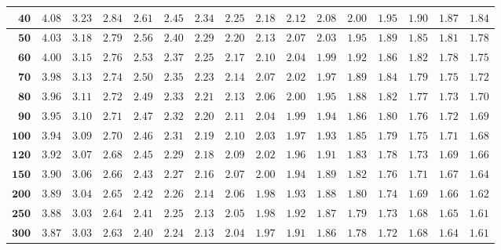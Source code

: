 \begin{longtable}{|r|r|r|r|r|r|r|r|r|r|r|r|r|r|r|r|}
    \(\mathbf{40}\) & \(4.08\) & \(3.23\) & \(2.84\) & \(2.61\) & \(2.45\) & \(2.34\) & \(2.25\) & \(2.18\) & \(2.12\) & \(2.08\) & \(2.00\) & \(1.95\) & \(1.90\) & \(1.87\) & \(1.84\) \\ \hline
    \(\mathbf{50}\) & \(4.03\) & \(3.18\) & \(2.79\) & \(2.56\) & \(2.40\) & \(2.29\) & \(2.20\) & \(2.13\) & \(2.07\) & \(2.03\) & \(1.95\) & \(1.89\) & \(1.85\) & \(1.81\) & \(1.78\) \\ \hline
    \(\mathbf{60}\) & \(4.00\) & \(3.15\) & \(2.76\) & \(2.53\) & \(2.37\) & \(2.25\) & \(2.17\) & \(2.10\) & \(2.04\) & \(1.99\) & \(1.92\) & \(1.86\) & \(1.82\) & \(1.78\) & \(1.75\) \\ \hline
    \(\mathbf{70}\) & \(3.98\) & \(3.13\) & \(2.74\) & \(2.50\) & \(2.35\) & \(2.23\) & \(2.14\) & \(2.07\) & \(2.02\) & \(1.97\) & \(1.89\) & \(1.84\) & \(1.79\) & \(1.75\) & \(1.72\) \\ \hline
    \(\mathbf{80}\) & \(3.96\) & \(3.11\) & \(2.72\) & \(2.49\) & \(2.33\) & \(2.21\) & \(2.13\) & \(2.06\) & \(2.00\) & \(1.95\) & \(1.88\) & \(1.82\) & \(1.77\) & \(1.73\) & \(1.70\) \\ \hline
    \(\mathbf{90}\) & \(3.95\) & \(3.10\) & \(2.71\) & \(2.47\) & \(2.32\) & \(2.20\) & \(2.11\) & \(2.04\) & \(1.99\) & \(1.94\) & \(1.86\) & \(1.80\) & \(1.76\) & \(1.72\) & \(1.69\) \\ \hline
    \(\mathbf{100}\) & \(3.94\) & \(3.09\) & \(2.70\) & \(2.46\) & \(2.31\) & \(2.19\) & \(2.10\) & \(2.03\) & \(1.97\) & \(1.93\) & \(1.85\) & \(1.79\) & \(1.75\) & \(1.71\) & \(1.68\) \\ \hline
    \(\mathbf{120}\) & \(3.92\) & \(3.07\) & \(2.68\) & \(2.45\) & \(2.29\) & \(2.18\) & \(2.09\) & \(2.02\) & \(1.96\) & \(1.91\) & \(1.83\) & \(1.78\) & \(1.73\) & \(1.69\) & \(1.66\) \\ \hline
    \(\mathbf{150}\) & \(3.90\) & \(3.06\) & \(2.66\) & \(2.43\) & \(2.27\) & \(2.16\) & \(2.07\) & \(2.00\) & \(1.94\) & \(1.89\) & \(1.82\) & \(1.76\) & \(1.71\) & \(1.67\) & \(1.64\) \\ \hline
    \(\mathbf{200}\) & \(3.89\) & \(3.04\) & \(2.65\) & \(2.42\) & \(2.26\) & \(2.14\) & \(2.06\) & \(1.98\) & \(1.93\) & \(1.88\) & \(1.80\) & \(1.74\) & \(1.69\) & \(1.66\) & \(1.62\) \\ \hline
    \(\mathbf{250}\) & \(3.88\) & \(3.03\) & \(2.64\) & \(2.41\) & \(2.25\) & \(2.13\) & \(2.05\) & \(1.98\) & \(1.92\) & \(1.87\) & \(1.79\) & \(1.73\) & \(1.68\) & \(1.65\) & \(1.61\) \\ \hline
    \(\mathbf{300}\) & \(3.87\) & \(3.03\) & \(2.63\) & \(2.40\) & \(2.24\) & \(2.13\) & \(2.04\) & \(1.97\) & \(1.91\) & \(1.86\) & \(1.78\) & \(1.72\) & \(1.68\) & \(1.64\) & \(1.61\) \\ \hline

\end{longtable}

